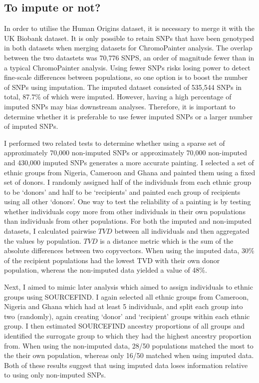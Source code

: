 \subsection{To impute or not?}

In order to utilise the Human Origins dataset, it is necessary to merge it with the UK Biobank dataset. It is only possible to retain SNPs that have been genotyped in both datasets when merging datasets for ChromoPainter analysis. The overlap between the two datastets was 70,776 SNPS, an order of magnitude fewer than in a typical ChromoPainter analysis. Using fewer SNPs risks losing power to detect fine-scale differences between populations, so one option is to boost the number of SNPs using imputation. The imputed dataset consisted of 535,544 SNPs in total, 87.7\% of which were imputed. However, having a high percentage of imputed SNPs may bias downstream analyses. Therefore, it is important to determine whether it is preferable to use fewer imputed SNPs or a larger number of imputed SNPs.

I performed two related tests to determine whether using a sparse set of approximately 70,000 non-imputed SNPs or approximately 70,000 non-imputed and 430,000 imputed SNPs generates a more accurate painting. I selected a set of ethnic groups from Nigeria, Cameroon and Ghana and painted them using a fixed set of donors. I randomly assigned half of the individuals from each ethnic group to be `donors' and half to be `recipients' and painted each group of recipients using all other `donors'. One way to test the reliability of a painting is by testing whether individuals copy more from other individuals in their own populations than individuals from other populations. For both the imputed and non-imputed datasets, I calculated pairwise $TVD$ between all individuals and then aggregated the values by population. $TVD$ is a distance metric which is the sum of the absolute differences between two copyvectors. When using the imputed data, 30\% of the recipient populations had the lowest TVD with their own donor population, whereas the non-imputed data yielded a value of 48\%. 

Next, I aimed to mimic later analysis which aimed to assign individuals to ethnic groups using SOURCEFIND. I again selected all ethnic groups from Cameroon, Nigeria and Ghana which had at least 5 individuals, and split each group into two (randomly), again creating `donor' and `recipient' groups within each ethnic group. I then estimated SOURCEFIND ancestry proportions of all groups and identified the surrogate group to which they had the highest ancestry proportion from. When using the non-imputed data, 28/50 populations matched the most to the their own population, whereas only 16/50 matched when using imputed data. Both of these results suggest that using imputed data loses information relative to using only non-imputed SNPs.

